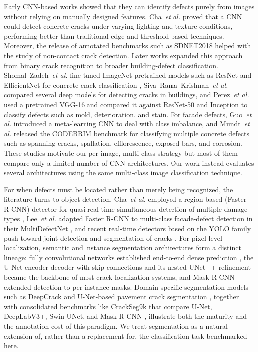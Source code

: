 \documentclass[ASNA, twocolumn]{USG}
\begin{document}
Early CNN-based works showed that they can identify defects purely from images without relying on manually designed features. Cha~\textit{et al.} \cite{ref5} proved that a CNN could detect concrete cracks under varying lighting and texture conditions, performing better than traditional edge and threshold-based techniques. Moreover, the release of annotated benchmarks such as SDNET2018 \cite{ref6} helped with the study of non-contact crack detection. Later works expanded this approach from binary crack recognition to broader building-defect classification. Shomal~Zadeh~\textit{et al.} \cite{ref7} fine-tuned ImageNet-pretrained models such as ResNet and EfficientNet for concrete crack classification , Siva~Rama~Krishnan~\textit{et al.} \cite{ref8} compared several deep models for detecting cracks in buildings, and Perez~\textit{et al.} \cite{ref9} used a pretrained VGG-16 and compared it against ResNet-50 and Inception to classify defects such as mold, deterioration, and stain. For facade defects, Guo~\textit{et al.} \cite{ref10} introduced a meta-learning CNN to deal with class imbalance, and Mundt~\textit{et al.} \cite{ref11} released the CODEBRIM benchmark for classifying multiple concrete defects such as spanning cracks, spallation, efflorescence, exposed bars, and corrosion. These studies motivate our per-image, multi-class strategy but most of them compare only a limited number of CNN architectures. Our work instead evaluates several architectures using the same multi-class image classification technique.

For when defects must be located rather than merely being recognized, the literature turns to object detection. Cha~\textit{et al.} \cite{ref12} employed a region-based (Faster R-CNN) detector for quasi-real-time simultaneous detection of multiple damage types , Lee~\textit{et al.} \cite{ref13} adapted Faster R-CNN to multi-class facade-defect detection in their MultiDefectNet , and recent real-time detectors based on the YOLO family push toward joint detection and segmentation of cracks \cite{ref14}. For pixel-level localization, semantic and instance segmentation architectures form a distinct lineage: fully convolutional networks established end-to-end dense prediction \cite{ref15}, the U-Net encoder-decoder with skip connections \cite{ref16} and its nested UNet++ refinement \cite{ref17} became the backbone of most crack-localization systems, and Mask R-CNN \cite{ref18} extended detection to per-instance masks. Domain-specific segmentation models such as DeepCrack \cite{ref19} and U-Net-based pavement crack segmentation \cite{ref20}, together with consolidated benchmarks like CrackSeg9k that compare U-Net, DeepLabV3+, Swin-UNet, and Mask R-CNN \cite{ref21}, illustrate both the maturity and the annotation cost of this paradigm. We treat segmentation as a natural extension of, rather than a replacement for, the classification task benchmarked here.
\end{document}
